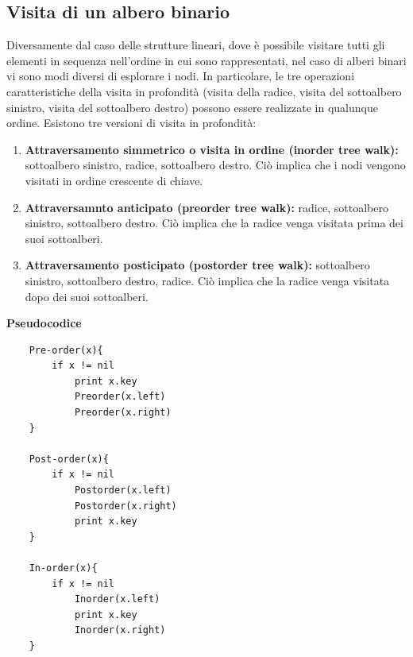 \subsection{Visita di un albero binario}
Diversamente dal caso delle strutture lineari, dove è possibile visitare tutti gli elementi in
sequenza nell’ordine in cui sono rappresentati, nel caso di alberi binari vi sono modi diversi
di esplorare i nodi. In particolare, le tre operazioni caratteristiche della visita in profondità
(visita della radice, visita del sottoalbero sinistro, visita del sottoalbero destro) possono essere
realizzate in qualunque ordine. Esistono tre versioni di visita in profondità:
\begin{enumerate}
    \item \textbf{Attraversamento simmetrico o visita in ordine (inorder tree walk):} sottoalbero sinistro, 
    radice, sottoalbero destro. Ciò implica che i nodi vengono visitati in ordine crescente di chiave.
    \item \textbf{Attraversamnto anticipato (preorder tree walk):} radice, sottoalbero sinistro,  sottoalbero destro. 
    Ciò implica che la radice venga visitata prima dei suoi sottoalberi.
    \item \textbf{Attraversamento posticipato (postorder tree walk):} sottoalbero sinistro, sottoalbero destro, radice. 
    Ciò implica che la radice venga visitata dopo dei suoi sottoalberi. 
\end{enumerate}
\noindent \textbf{Pseudocodice}
\begin{verbatim}
    Pre-order(x){
        if x != nil
            print x.key
            Preorder(x.left)
            Preorder(x.right)
    }

    Post-order(x){
        if x != nil
            Postorder(x.left)
            Postorder(x.right)
            print x.key
    }

    In-order(x){
        if x != nil
            Inorder(x.left)
            print x.key
            Inorder(x.right)
    }
\end{verbatim}
